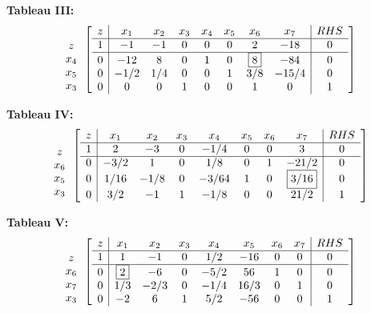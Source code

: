 \begin{example}
\noindent\textbf{Tableau III:}
\begin{displaymath}
\begin{array}{c}
\\z\\x_4\\x_5\\x_3
\end{array}\left[
\begin{array}{c|ccccccc|c}
z & x_1 & x_2 & x_3 & x_4 & x_5 & x_6 & x_7 & RHS\\
\hline
1 & -1 & -1 & 0 & 0 & 0 & 2  & -18 & 0\\
\hline
0 & -12  & 8   & 0 & 1   & 0    & \fbox{8}    & -84     & 0\\
0 & -1/2 & 1/4 & 0 & 0   & 1    & 3/8  & -15/4   & 0\\
0 & 0    & 0   & 1 & 0   & 0    & 1    & 0       & 1
\end{array}\right]
\end{displaymath}

\noindent\textbf{Tableau IV:}
\begin{displaymath}
\begin{array}{c}
\\z\\x_6\\x_5\\x_3
\end{array}\left[
\begin{array}{c|ccccccc|c}
z & x_1 & x_2 & x_3 & x_4 & x_5 & x_6 & x_7 & RHS\\
\hline
1 & 2 & -3 & 0 & -1/4 & 0 & 0  & 3 & 0\\
\hline
0 & -3/2  & 1     & 0 & 1/8   & 0    & 1    & -21/2   & 0\\
0 & 1/16  & -1/8  & 0 & -3/64 & 1    & 0    & \fbox{3/16}    & 0\\
0 & 3/2   & -1    & 1 & -1/8  & 0    & 0    & 21/2    & 1
\end{array}\right]
\end{displaymath}

\noindent\textbf{Tableau V:}
\begin{displaymath}
\begin{array}{c}
\\z\\x_6\\x_7\\x_3
\end{array}\left[
\begin{array}{c|ccccccc|c}
z & x_1 & x_2 & x_3 & x_4 & x_5 & x_6 & x_7 & RHS\\
\hline
1 & 1 & -1 & 0 & 1/2 & -16 & 0 & 0 & 0\\
\hline
0 & \fbox{2}     & -6    & 0 & -5/2  & 56   & 1    & 0    & 0\\
0 & 1/3   & -2/3  & 0 & -1/4  & 16/3 & 0    & 1    & 0\\
0 & -2    &  6    & 1 &  5/2  & -56  & 0    & 0    & 1
\end{array}\right]
\end{displaymath}


\end{example}
